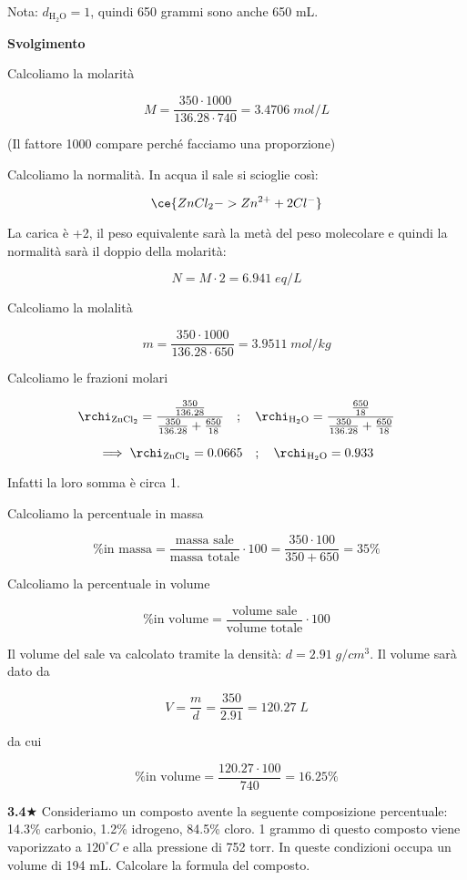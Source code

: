 \vspace{0.2cm}Nota: $d_{\text{H}_2\text{O}}=1$, quindi 650 grammi sono anche 650 mL.

\vspace{0.2cm}\large\textbf{Svolgimento}\normalsize

\vspace{0.2cm}Calcoliamo la molarità

$$M=\frac{350 \cdot 1000}{136.28 \cdot 740}=3.4706\;mol/L$$

(Il fattore 1000 compare perché facciamo una proporzione)

Calcoliamo la normalità. In acqua il sale si scioglie così:

$$\ce{ZnCl_2 -> Zn^{2+} + 2Cl^-}$$

La carica è +2, il peso equivalente sarà la metà del peso molecolare e quindi la normalità sarà il doppio della molarità:

$$N=M \cdot 2=6.941\;eq/L$$

Calcoliamo la molalità

$$m=\frac{350 \cdot 1000}{136.28 \cdot 650}=3.9511\;mol/kg$$

Calcoliamo le frazioni molari

$$\rchi_{\rm ZnCl_2}=\frac{\frac{350}{136.28}}{\frac{350}{136.28} + \frac{650}{18}}
\quad;\quad
\rchi_{\rm H_2O}=\frac{\frac{650}{18}}{\frac{350}{136.28} + \frac{650}{18}}$$

$$\implies
\rchi_{\rm ZnCl_2}=0.0665
\quad;\quad
\rchi_{\rm H_2O}=0.933
$$

Infatti la loro somma è circa 1.

Calcoliamo la percentuale in massa

$$\text{\% in massa}
=\frac{\text{massa sale}}{\text{massa totale}} \cdot 100
=\frac{350 \cdot 100}{350 + 650}=35\%$$

Calcoliamo la percentuale in volume

$$\text{\% in volume}
=\frac{\text{volume sale}}{\text{volume totale}} \cdot 100$$

Il volume del sale va calcolato tramite la densità: $d=2.91\;g/cm^3$. Il volume sarà dato da

$$V=\frac{m}{d}=\frac{350}{2.91}=120.27\;L$$

da cui 

$$\text{\% in volume}
=\frac{120.27 \cdot 100}{740}=16.25\%$$

\vspace{0.2cm}\textbf{3.4}$\bigstar$ Consideriamo un composto avente la seguente composizione percentuale: 14.3\% carbonio, 1.2\% idrogeno, 84.5\% cloro. 1 grammo di questo composto viene vaporizzato a $120^{\circ}C$ e alla pressione di 752 torr. In queste condizioni occupa un volume di 194 mL. Calcolare la formula del composto.

